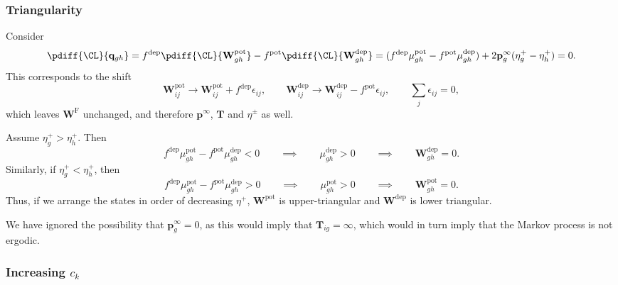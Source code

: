 \documentclass{article} %
\newcommand{\pr}{\mathbf{p}}
\newcommand{\eq}{\pr^\infty}
\newcommand{\fpt}{\mathbf{T}}
\newcommand{\W}{\mathbf{W}}
\newcommand{\enc}{\mathbf{q}}
\newcommand{\frg}{\W^{\mathrm{F}}}
\newcommand{\pot}{^{\text{pot}}}
\newcommand{\dep}{^{\text{dep}}}
\newcommand{\potdep}{^{\text{pot/dep}}}
\begin{document}
\subsubsection{Triangularity}\label{sec:triangular}

Consider
%
\begin{equation}\label{eq:shiftqderiv}
  \pdiff{\CL}{\enc_{gh}} =
  f\dep  \pdiff{\CL}{\W\pot _{gh}} - f\pot  \pdiff{\CL}{\W\dep _{gh}}
   = (f\dep  \mu\pot _{gh} - f\pot  \mu\dep _{gh}) + 2\eq_g (\eta^+_g - \eta^+_h)
   = 0.
\end{equation}
%
This corresponds to the shift
%
\begin{equation}\label{eq:shiftq}
  \W\pot _{ij} \to \W\pot _{ij} + f\dep \epsilon_{ij},
  \qquad
  \W\dep _{ij} \to \W\dep _{ij} - f\pot \epsilon_{ij},
  \qquad
  \sum_j \epsilon_{ij} = 0,
\end{equation}
%
which leaves $\frg$ unchanged, and therefore $\eq$, $\fpt$ and $\eta^\pm$ as well.

Assume $\eta^+_g > \eta^+_h$. Then
%
\begin{equation}\label{eq:lowertriangular}
 f\dep  \mu\pot _{gh} - f\pot  \mu\dep _{gh} <0
 \qquad\implies\qquad
 \mu\dep _{gh} >0
 \qquad\implies\qquad
 \W\dep _{gh}=0.
\end{equation}
%
Similarly, if $\eta^+_g < \eta^+_h$, then
%
\begin{equation}\label{eq:uppertriangular}
 f\dep  \mu\pot _{gh} - f\pot  \mu\dep _{gh} > 0
 \qquad\implies\qquad
 \mu\pot _{gh} >0
 \qquad\implies\qquad
 \W\pot _{gh}=0.
\end{equation}
%
Thus, if we arrange the states in order of decreasing $\eta^+$, $\W\pot $ is upper-triangular and $\W\dep $ is lower triangular.

We have ignored the possibility that $\eq_g=0$, as this would imply that $\fpt_{ig}=\infty$, which would in turn imply that the Markov process is not ergodic.


\subsubsection{Increasing \texorpdfstring{$c_k$}{c(k)}}\label{sec:areacoeffincr}
\end{document}
